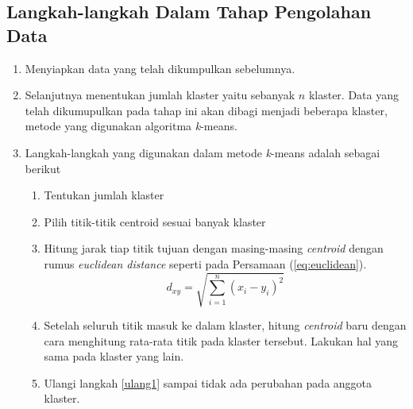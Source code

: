 \subsection{Langkah-langkah Dalam Tahap Pengolahan Data}
\begin{enumerate}
    \item Menyiapkan data yang telah dikumpulkan sebelumnya.
    \item Selanjutnya menentukan jumlah klaster yaitu sebanyak $n$ klaster. Data yang telah dikumupulkan pada tahap ini akan dibagi menjadi beberapa klaster, metode yang digunakan algoritma \textit{k}-means.
    \item Langkah-langkah yang digunakan dalam metode \textit{k}-means adalah sebagai berikut
    \begin{enumerate}
        \item Tentukan jumlah klaster
        \item Pilih titik-titik centroid sesuai banyak klaster
        \item \label{ulang1} Hitung jarak tiap titik tujuan dengan masing-masing \textit{centroid} dengan rumus \textit{euclidean distance} seperti pada Persamaan (\ref{eq:euclidean}).
        \begin{equation}
        d_{xy}=\sqrt{\sum_{i=1}^{n}(x_i-y_i)^{2}}
        \label{eq:euclidean}
        \end{equation}
        \item Setelah seluruh titik masuk ke dalam klaster, hitung \textit{centroid} baru dengan cara menghitung rata-rata titik pada klaster tersebut. Lakukan hal yang sama pada klaster yang lain.
        \item Ulangi langkah \ref{ulang1} sampai tidak ada perubahan pada anggota klaster.
    \end{enumerate}
	

\end{enumerate}

